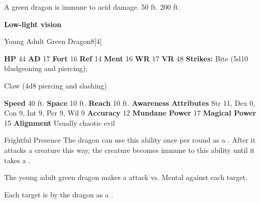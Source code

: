       
       A green dragon is immune to acid damage.
     50 ft.
     200 ft.
    \par\noindent\textbf{Low-light vision}
  

  \begin{monsubsection}{Young Adult Green Dragon}{8}[4]
    \vspace{-1em}\vspace{-1em}
    \vspace{0em}

    
    

    \begin{spellcontent}
      \begin{spelltargetinginfo}
        \pari \textbf{HP} 44 \monsep
          \textbf{AD} 17 \monsep
          \textbf{Fort} 16 \monsep
          \textbf{Ref} 14 \monsep
          \textbf{Ment} 16
        \pari \textbf{WR} 17 \monsep
        \textbf{VR} 48
        \pari \textbf{Strikes:}
            Bite  (5d10 bludgeoning and piercing);
\par Claw  (4d8 piercing and slashing)
      \end{spelltargetinginfo}
    \end{spellcontent}
    \begin{monsterfooter}
      \pari \textbf{Speed} 40 ft. \monsep
        \textbf{Space} 10 ft. \monsep
        \textbf{Reach} 10 ft.
      \pari \textbf{Awareness} 
      \pari \textbf{Attributes}
        Str 11, Dex 0,
        Con 9, Int 9,
        Per 9, Wil 9
      \pari \textbf{Accuracy} 12 \monsep
        \textbf{Mundane Power} 17 \monsep
      \textbf{Magical Power} 15
      \pari \textbf{Alignment} Usually chaotic evil
    \end{monsterfooter}
  \end{monsubsection}
  \begin{freeability}{Frightful Presence}
      The dragon can use this ability once per round as a .
      After it attacks a creature this way, the creature becomes immune to this ability until it takes a .
      \par The young adult green dragon makes a  attack
        vs. Mental against each target.
    
    \hit Each target is  by the dragon as a .
    \end{freeability}
  

